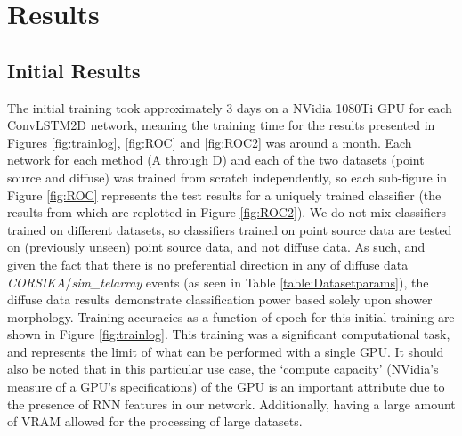 \section{Results} \label{Results}
\subsection{Initial Results}
 The initial training took approximately 3 days on a NVidia 1080Ti GPU for each ConvLSTM2D network, meaning the training time for the results presented in Figures \ref{fig:trainlog}, \ref{fig:ROC} and \ref{fig:ROC2} was around a month. Each network for each method (A through D) and each of the two datasets (point source and diffuse) was trained from scratch independently, so each sub-figure in Figure \ref{fig:ROC} represents the test results for a uniquely trained classifier (the results from which are re\-plotted in Figure \ref{fig:ROC2}). We do not mix classifiers trained on different datasets, so classifiers trained on point source data are tested on (previously unseen) point source data, and not diffuse data. As such, and given the fact that there is no preferential direction in any of diffuse data \textit{CORSIKA}/\textit{sim\_telarray} events (as seen in Table \ref{table:Datasetparams}), the diffuse data results demonstrate classification power based solely upon shower morphology. Training accuracies as a function of epoch for this initial training are shown in Figure \ref{fig:trainlog}. This training was a significant computational task, and represents the limit of what can be performed with a single GPU. It should also be noted that in this particular use case, the `compute capacity' (NVidia's measure of a GPU's specifications) of the GPU is an important attribute due to the presence of RNN features in our network. Additionally, having a large amount of VRAM allowed for the processing of large datasets.
 
